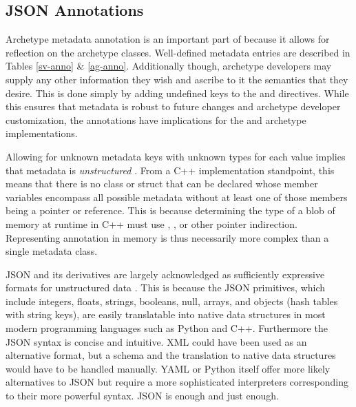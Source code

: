 \subsection{JSON Annotations}

Archetype metadata annotation is an important part of \cyclus because it allows for 
reflection on the archetype classes. Well-defined metadata entries are 
described in Tables \ref{sv-anno} \& \ref{ag-anno}. 
Additionally though, archetype developers may supply 
any other information they wish and ascribe to it the semantics that they desire.
This is done simply by adding undefined keys to the  and
 \cycpp directives.
While this ensures that metadata is robust to future changes and archetype developer
customization, the annotations have implications for the \cyclus and archetype 
implementations.

Allowing for unknown metadata keys with unknown types for each value implies that 
metadata is \emph{unstructured} \cite{feldman2007text}. From a C++ implementation 
standpoint, this means that there is no class or struct that can be declared whose
member variables encompass all possible metadata without at least one of those
members being a pointer or reference. This is because determining the type 
of a blob of memory at runtime in C++ must use , , 
or other pointer indirection. Representing annotation in memory is thus 
necessarily more complex than a single metadata class.

\acrlong{JSON} and its derivatives are largely acknowledged as sufficiently expressive 
formats for unstructured data \cite{moniruzzaman2013nosql}. This is because the
\gls{JSON} primitives, which include integers, floats, strings, booleans, null, arrays, 
and objects (hash tables with string keys), are easily translatable into native
data structures in most modern programming languages such as Python and C++. 
Furthermore the \gls{JSON} syntax is concise and intuitive. \gls{XML} could have been used 
as an alternative format, but a schema and the translation to native data structures 
would have to be handled manually. \gls{YAML} \cite{ben2009yaml} or Python itself offer 
more likely  alternatives to \gls{JSON} but require a more sophisticated interpreters 
corresponding to their more powerful syntax. \gls{JSON} is enough and just enough.

